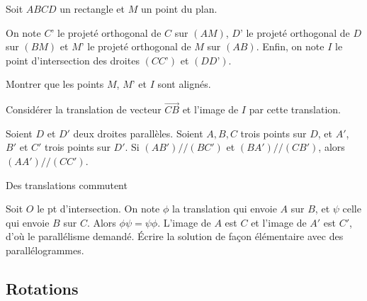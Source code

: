 \begin{exo}[Alignement] %

Soit $ABCD$ un rectangle et $M$ un point du plan.

On note $C’$ le projeté orthogonal de $C$ sur $(AM)$,
$D’$  le projeté orthogonal de $D$ sur $(BM)$ et 
$M’$  le projeté orthogonal de $M$ sur $(AB)$. 
Enfin, on note $I$ le point d'intersection des droites $(CC’)$ et $(DD’)$.

Montrer que les points $M$, $M’$ et $I$ sont alignés.

\begin{hint}   
Considérer la translation de vecteur $\overrightarrow{CB}$ et l'image de $I$ par cette translation.
\end{hint}

\end{exo}  

\begin{exo} %
Soient $D$ et $D'$ deux droites  parallèles. Soient $A, B, C$ trois points sur $D$, et $A'$, $B'$ et $C'$ trois points sur $D'$. Si $(AB') // (BC')$ et $(BA') // (CB')$, alors $(AA') // (CC')$.
\begin{hint}
Des translations  commutent
\end{hint}
\begin{sol}     
Soit $O$ le pt d'intersection. On note $\phi$ la translation qui envoie $A$ sur $B$, et $\psi$ celle qui envoie $B$ sur $C$. Alors $\phi\psi = \psi\phi$. L'image de $A$ est $C$ et l'image de $A'$ est $C'$, d'où le  parallélisme demandé.
\'Ecrire la solution de façon élémentaire avec des parallélogrammes.
\end{sol}
\end{exo}  

\subsection{Rotations}


